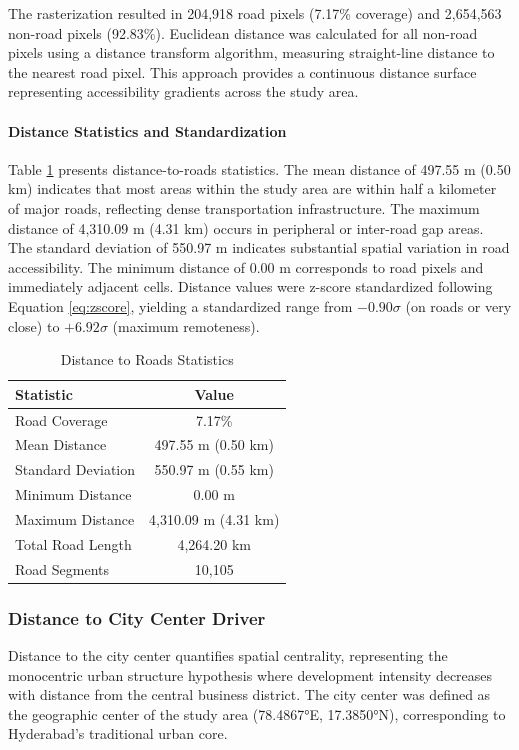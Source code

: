 \documentclass[12pt,a4paper]{article}
\begin{document}
The rasterization resulted in 204,918 road pixels (7.17\% coverage) and 2,654,563 non-road pixels (92.83\%). Euclidean distance was calculated for all non-road pixels using a distance transform algorithm, measuring straight-line distance to the nearest road pixel. This approach provides a continuous distance surface representing accessibility gradients across the study area.

\paragraph{Distance Statistics and Standardization}
Table \ref{tab:distance_roads_stats} presents distance-to-roads statistics. The mean distance of 497.55 m (0.50 km) indicates that most areas within the study area are within half a kilometer of major roads, reflecting dense transportation infrastructure. The maximum distance of 4,310.09 m (4.31 km) occurs in peripheral or inter-road gap areas. The standard deviation of 550.97 m indicates substantial spatial variation in road accessibility. The minimum distance of 0.00 m corresponds to road pixels and immediately adjacent cells. Distance values were z-score standardized following Equation \ref{eq:zscore}, yielding a standardized range from $-0.90\sigma$ (on roads or very close) to $+6.92\sigma$ (maximum remoteness).

\begin{table}[H]
\caption{Distance to Roads Statistics}
\label{tab:distance_roads_stats}
\centering
\small
\begin{tabular}{lc}
\toprule
\textbf{Statistic} & \textbf{Value} \\
\midrule
Road Coverage & 7.17\% \\
Mean Distance & 497.55 m (0.50 km) \\
Standard Deviation & 550.97 m (0.55 km) \\
Minimum Distance & 0.00 m \\
Maximum Distance & 4,310.09 m (4.31 km) \\
Total Road Length & 4,264.20 km \\
Road Segments & 10,105 \\
\bottomrule
\end{tabular}
\end{table}
\subsubsection{Distance to City Center Driver}

Distance to the city center quantifies spatial centrality, representing the monocentric urban structure hypothesis where development intensity decreases with distance from the central business district. The city center was defined as the geographic center of the study area (78.4867°E, 17.3850°N), corresponding to Hyderabad's traditional urban core.
\end{document}

